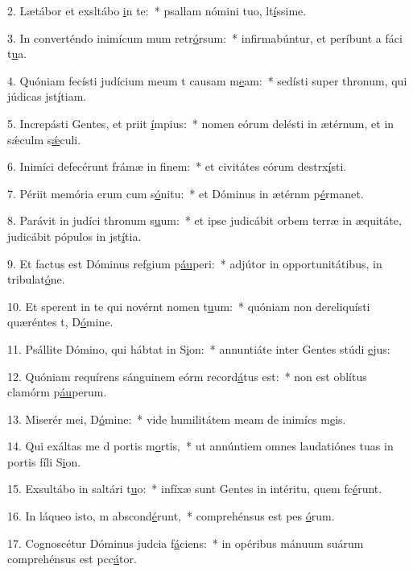 2. Lætábor et exsltábo \uline{i}n te:~* psallam nómini tuo, lt\uline{í}ssime.\par 
3. In converténdo inimícum mum retr\uline{ó}rsum:~* infirmabúntur, et períbunt a fáci t\uline{u}a.\par 
4. Quóniam fecísti judícium meum t causam m\uline{e}am:~* sedísti super thronum, qui júdicas jst\uline{í}tiam.\par 
5. Increpásti Gentes, et priit \uline{í}mpius:~* nomen eórum delésti in ætérnum, et in sǽculm s\uline{ǽ}culi.\par 
6. Inimíci defecérunt frámæ in f\uline{i}nem:~* et civitátes eórum destrx\uline{í}sti.\par 
7. Périit memória erum cum s\uline{ó}nitu:~* et Dóminus in ætérnm p\uline{é}rmanet.\par 
8. Parávit in judíci thronum s\uline{u}um:~* et ipse judicábit orbem terræ in æquitáte, judicábit pópulos in jst\uline{í}tia.\par 
9. Et factus est Dóminus refgium p\uline{áu}peri:~* adjútor in opportunitátibus, in tribulat\uline{ó}ne.\par 
10. Et sperent in te qui novérnt nomen t\uline{u}um:~* quóniam non dereliquísti quæréntes t, D\uline{ó}mine.\par 
11. Psállite Dómino, qui hábtat in S\uline{i}on:~* annuntiáte inter Gentes stúdi \uline{e}jus:\par 
12. Quóniam requírens sánguinem eórm record\uline{á}tus est:~* non est oblítus clamórm p\uline{áu}perum.\par 
13. Miserér mei, D\uline{ó}mine:~* vide humilitátem meam de inimícs m\uline{e}is.\par 
14. Qui exáltas me d portis m\uline{o}rtis,~* ut annúntiem omnes laudatiónes tuas in portis fíli S\uline{i}on.\par 
15. Exsultábo in saltári t\uline{u}o:~* infíxæ sunt Gentes in intéritu, quem fc\uline{é}runt.\par 
16. In láqueo isto, m abscond\uline{é}runt,~* comprehénsus est pes \uline{ó}rum.\par 
17. Cognoscétur Dóminus judcia f\uline{á}ciens:~* in opéribus mánuum suárum comprehénsus est pcc\uline{á}tor.\par 
